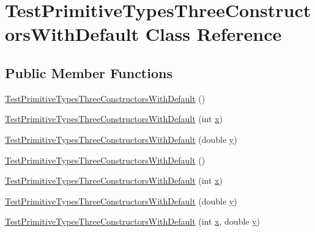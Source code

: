 \hypertarget{classTestPrimitiveTypesThreeConstructorsWithDefault}{
\section{TestPrimitiveTypesThreeConstructorsWithDefault Class Reference}
\label{classTestPrimitiveTypesThreeConstructorsWithDefault}
}
\subsection*{Public Member Functions}
\begin{DoxyCompactItemize}
\item 
\hyperlink{classTestPrimitiveTypesThreeConstructorsWithDefault_a736ad9ddb8f1d482173d17b1cbbd5fca}{TestPrimitiveTypesThreeConstructorsWithDefault} ()
\item 
\hyperlink{classTestPrimitiveTypesThreeConstructorsWithDefault_af50fe48c7a45ae57a25309c990187d4a}{TestPrimitiveTypesThreeConstructorsWithDefault} (int \hyperlink{classTestPrimitiveTypesThreeConstructorsWithDefault_a5e4c988b58349e4fceabc073d36619f4}{x})
\item 
\hyperlink{classTestPrimitiveTypesThreeConstructorsWithDefault_a2bc6ff4bd0e1e57c4f6c5f8a78e4fd12}{TestPrimitiveTypesThreeConstructorsWithDefault} (double \hyperlink{classTestPrimitiveTypesThreeConstructorsWithDefault_ad6a2a263ac5e32f812d30c63fd20ca98}{y})
\item 
\hyperlink{classTestPrimitiveTypesThreeConstructorsWithDefault_a736ad9ddb8f1d482173d17b1cbbd5fca}{TestPrimitiveTypesThreeConstructorsWithDefault} ()
\item 
\hyperlink{classTestPrimitiveTypesThreeConstructorsWithDefault_af50fe48c7a45ae57a25309c990187d4a}{TestPrimitiveTypesThreeConstructorsWithDefault} (int \hyperlink{classTestPrimitiveTypesThreeConstructorsWithDefault_a5e4c988b58349e4fceabc073d36619f4}{x})
\item 
\hyperlink{classTestPrimitiveTypesThreeConstructorsWithDefault_a2bc6ff4bd0e1e57c4f6c5f8a78e4fd12}{TestPrimitiveTypesThreeConstructorsWithDefault} (double \hyperlink{classTestPrimitiveTypesThreeConstructorsWithDefault_ad6a2a263ac5e32f812d30c63fd20ca98}{y})
\item 
\hyperlink{classTestPrimitiveTypesThreeConstructorsWithDefault_a724ca610b65df4a0ba97661263448480}{TestPrimitiveTypesThreeConstructorsWithDefault} (int \hyperlink{classTestPrimitiveTypesThreeConstructorsWithDefault_a5e4c988b58349e4fceabc073d36619f4}{x}, double \hyperlink{classTestPrimitiveTypesThreeConstructorsWithDefault_ad6a2a263ac5e32f812d30c63fd20ca98}{y})
\end{DoxyCompactItemize}
